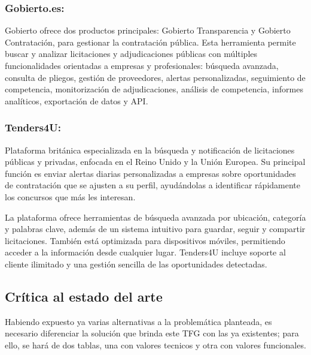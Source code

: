\documentclass{article}
\begin{document}
  \subsubsection{Gobierto.es:} Gobierto ofrece dos productos principales: Gobierto Transparencia  y Gobierto Contratación, para gestionar la contratación pública. Esta herramienta permite buscar y analizar licitaciones y adjudicaciones públicas con múltiples funcionalidades orientadas a empresas y profesionales: búsqueda avanzada, consulta de pliegos, gestión de proveedores, alertas personalizadas, seguimiento de competencia, monitorización de adjudicaciones, análisis de competencia, informes analíticos, exportación de datos y API.
  \cite{Gobierto}

  \subsubsection{Tenders4U:} Plataforma británica especializada en la búsqueda y notificación de licitaciones públicas y privadas, enfocada en el Reino Unido y la Unión Europea. Su principal función es enviar alertas diarias personalizadas a empresas sobre oportunidades de contratación que se ajusten a su perfil, ayudándolas a identificar rápidamente los concursos que más les interesan.

La plataforma ofrece herramientas de búsqueda avanzada por ubicación, categoría y palabras clave, además de un sistema intuitivo para guardar, seguir y compartir licitaciones. También está optimizada para dispositivos móviles, permitiendo acceder a la información desde cualquier lugar. Tenders4U incluye soporte al cliente ilimitado y una gestión sencilla de las oportunidades detectadas.
  
\subsection{Crítica al estado del arte}
Habiendo expuesto ya varias alternativas a la problemática planteada, es necesario diferenciar la solución que brinda este TFG  con las ya existentes; para ello, se hará de dos tablas, una con valores tecnicos y otra con valores funcionales. 
\end{document}
